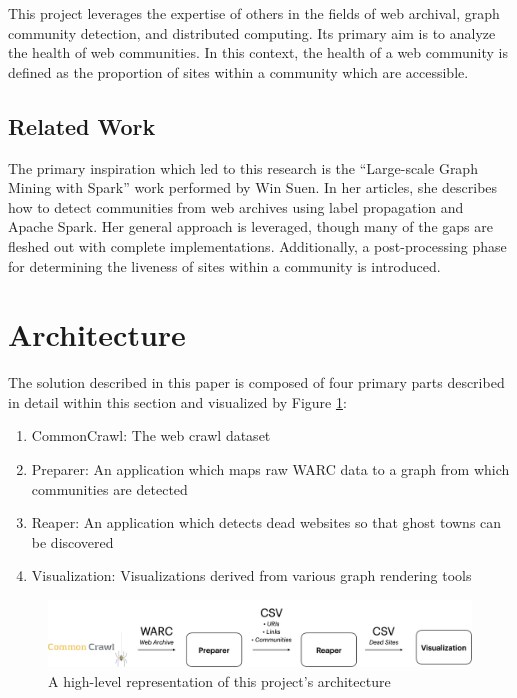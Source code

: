 \documentclass[conference]{IEEEtran}
\begin{document}
This project leverages the expertise of others in the fields of web archival, graph community detection, and distributed computing. Its primary aim is to analyze the health of web communities. In this context, the health of a web community is defined as the proportion of sites within a community which are accessible.

\subsection{Related Work}

The primary inspiration which led to this research is the ``Large-scale Graph Mining with Spark'' work performed by Win Suen. In her articles\cite{largeScaleGraphMiningWithSpark1}\cite{largeScaleGraphMiningWithSpark2}, she describes how to detect communities from web archives using label propagation and Apache Spark. Her general approach is leveraged, though many of the gaps are fleshed out with complete implementations. Additionally, a post-processing phase for determining the liveness of sites within a community is introduced.

\section{Architecture}

The solution described in this paper is composed of four primary parts described in detail within this section and visualized by Figure \ref{fig:architecture}:
\begin{enumerate}
	\item CommonCrawl: The web crawl dataset
	\item Preparer: An application which maps raw WARC data to a graph from which communities are detected
	\item Reaper: An application which detects dead websites so that ghost towns can be discovered
	\item Visualization: Visualizations derived from various graph rendering tools
\end{enumerate}

\begin{figure}[htbp]
 \centerline{\includegraphics[width=\textwidth]{Architecture.png}}
 \caption{A high-level representation of this project's architecture}
 \label{fig:architecture}
\end{figure}
\end{document}
